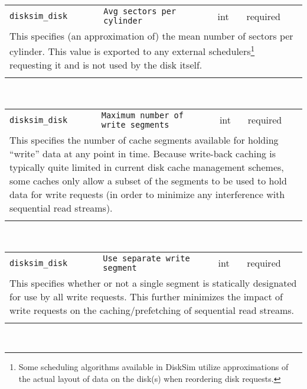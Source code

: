 \noindent 
\begin{tabular}{|p{1.5in}|p{3.5in}|p{0.5in}|p{0.5in}|}
\cline{1-4}
\texttt{disksim\_disk} & \texttt{Avg sectors per cylinder} & int & required \\ 
\cline{1-4}
\multicolumn{4}{|p{6in}|}{
This specifies (an approximation of) the mean number of sectors per
cylinder. This value is exported to any external
schedulers\footnote{Some scheduling algorithms available in DiskSim
utilize approximations of the actual layout of data on the disk(s)
when reordering disk requests.} requesting it and is not used by the
disk itself.
}\\ 
\cline{1-4}
\multicolumn{4}{p{5in}}{}\\
\end{tabular}\\ 
\noindent 
\begin{tabular}{|p{1.5in}|p{3.5in}|p{0.5in}|p{0.5in}|}
\cline{1-4}
\texttt{disksim\_disk} & \texttt{Maximum number of write segments} & int & required \\ 
\cline{1-4}
\multicolumn{4}{|p{6in}|}{
This specifies the number of cache segments available for holding
``write'' data at any point in time. Because write-back caching is
typically quite limited in current disk cache management schemes, some
caches only allow a subset of the segments to be used to hold data for
write requests (in order to minimize any interference with sequential
read streams).
}\\ 
\cline{1-4}
\multicolumn{4}{p{5in}}{}\\
\end{tabular}\\ 
\noindent 
\begin{tabular}{|p{1.5in}|p{3.5in}|p{0.5in}|p{0.5in}|}
\cline{1-4}
\texttt{disksim\_disk} & \texttt{Use separate write segment} & int & required \\ 
\cline{1-4}
\multicolumn{4}{|p{6in}|}{
This specifies whether or not a single segment is statically designated
for use by all write requests. This further minimizes the impact of
write requests on the caching/prefetching of sequential read streams.
}\\ 
\cline{1-4}
\multicolumn{4}{p{5in}}{}\\
\end{tabular}\\ 
\noindent 
